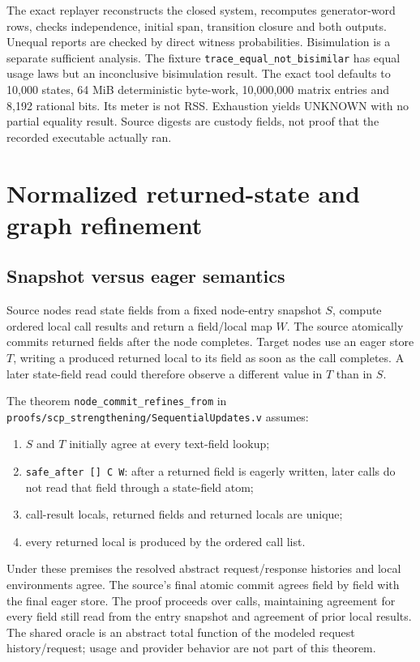 \documentclass[11pt,a4paper]{article}
\newcommand{\cp}[1]{\nolinkurl{#1}}
\begin{document}
The exact replayer reconstructs the closed system, recomputes generator-word rows, checks independence, initial span, transition closure and both outputs. Unequal reports are checked by direct witness probabilities. Bisimulation is a separate sufficient analysis. The fixture \cp{trace_equal_not_bisimilar} has equal usage laws but an inconclusive bisimulation result. The exact tool defaults to 10,000 states, 64 MiB deterministic byte-work, 10,000,000 matrix entries and 8,192 rational bits. Its meter is not RSS. Exhaustion yields UNKNOWN with no partial equality result. Source digests are custody fields, not proof that the recorded executable actually ran.

\section{Normalized returned-state and graph refinement}
\subsection{Snapshot versus eager semantics}
Source nodes read state fields from a fixed node-entry snapshot $S$, compute ordered local call results and return a field/local map $W$. The source atomically commits returned fields after the node completes. Target nodes use an eager store $T$, writing a produced returned local to its field as soon as the call completes. A later state-field read could therefore observe a different value in $T$ than in $S$.

The theorem \cp{node_commit_refines_from} in \cp{proofs/scp_strengthening/SequentialUpdates.v} assumes:
\begin{enumerate}
\item $S$ and $T$ initially agree at every text-field lookup;
\item \texttt{safe\_after [] C W}: after a returned field is eagerly written, later calls do not read that field through a state-field atom;
\item call-result locals, returned fields and returned locals are unique;
\item every returned local is produced by the ordered call list.
\end{enumerate}
Under these premises the resolved abstract request/response histories and local environments agree. The source's final atomic commit agrees field by field with the final eager store. The proof proceeds over calls, maintaining agreement for every field still read from the entry snapshot and agreement of prior local results. The shared oracle is an abstract total function of the modeled request history/request; usage and provider behavior are not part of this theorem.
\end{document}
